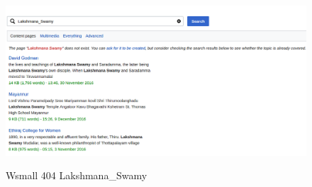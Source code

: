 \documentclass[11pt]{article}
\begin{document}
\begin{figure}[H]
\centering
{\includegraphics[scale=0.8]{wsmall_live_404.png}}
\caption{Wsmall 404  Lakshmana\_Swamy}
\label{fig:ws_l4042}
\end{figure}
\end{document}

